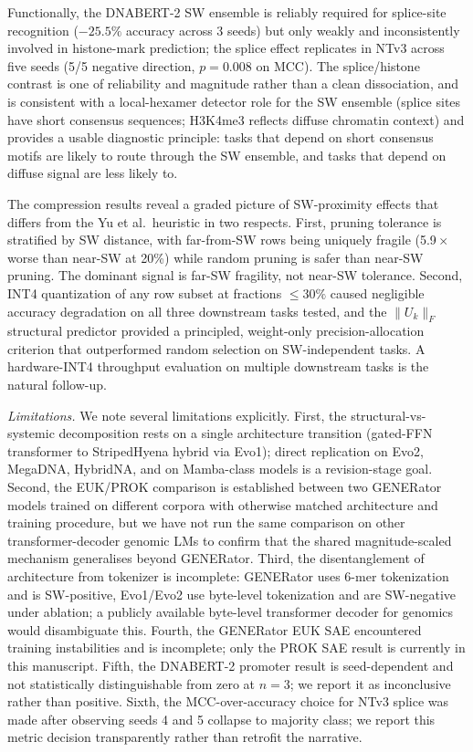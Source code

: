 \documentclass[11pt]{article}
\begin{document}
Functionally, the DNABERT-2 SW ensemble is reliably required for
splice-site recognition ($-25.5\%$ accuracy across 3 seeds) but only
weakly and inconsistently involved in histone-mark prediction; the
splice effect replicates in NTv3 across five seeds (5/5 negative
direction, $p = 0.008$ on MCC). The splice/histone contrast is one of
reliability and magnitude rather than a clean dissociation, and is
consistent with a local-hexamer
detector role for the SW ensemble (splice sites have short
consensus sequences; H3K4me3 reflects diffuse chromatin context)
and provides a usable diagnostic principle: tasks that depend on
short consensus motifs are likely to route through the SW ensemble,
and tasks that depend on diffuse signal are less likely to.

The compression results reveal a graded picture of SW-proximity
effects that differs from the Yu et al.\ heuristic in two respects.
First, pruning tolerance is stratified by SW distance, with
far-from-SW rows being uniquely fragile (5.9\,$\times$ worse than
near-SW at 20\%) while random pruning is safer than near-SW pruning.
The dominant signal is far-SW fragility, not near-SW tolerance.
Second, INT4 quantization of any row subset at fractions
$\leq 30\%$ caused negligible accuracy degradation on all three
downstream tasks tested, and the $\|U_k\|_F$ structural predictor
provided a principled, weight-only precision-allocation criterion
that outperformed random selection on SW-independent tasks. A
hardware-INT4 throughput evaluation on multiple downstream tasks
is the natural follow-up.

\textit{Limitations.}
We note several limitations explicitly. First, the
structural-vs-systemic decomposition rests on a single architecture
transition (gated-FFN transformer to StripedHyena hybrid via Evo1);
direct replication on Evo2, MegaDNA, HybridNA, and on Mamba-class
models is a revision-stage goal. Second, the EUK/PROK
comparison is established between two GENERator models trained
on different corpora with otherwise matched architecture and
training procedure, but we have not run the same comparison on
other transformer-decoder genomic LMs to confirm that the shared
magnitude-scaled mechanism generalises beyond GENERator. Third, the disentanglement of
architecture from tokenizer is incomplete: GENERator uses 6-mer
tokenization and is SW-positive, Evo1/Evo2 use byte-level
tokenization and are SW-negative under ablation; a publicly
available byte-level transformer decoder for genomics would
disambiguate this. Fourth, the GENERator EUK SAE encountered
training instabilities and is incomplete; only the PROK SAE result
is currently in this manuscript. Fifth, the DNABERT-2 promoter
result is seed-dependent and not statistically distinguishable from
zero at $n = 3$; we report it as inconclusive rather than positive.
Sixth, the MCC-over-accuracy choice for NTv3 splice was made after
observing seeds 4 and 5 collapse to majority class; we report this
metric decision transparently rather than retrofit the narrative.
\end{document}
